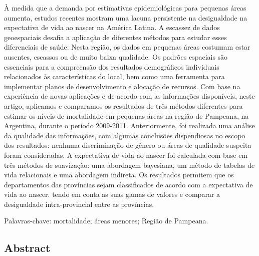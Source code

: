 \documentclass[12pt,spanish,]{article}
\begin{document}
À medida que a demanda por estimativas epidemiológicas para pequenas
áreas aumenta, estudos recentes mostram uma lacuna persistente na
desigualdade na expectativa de vida ao nascer na América Latina. A
escassez de dados geoespaciais desafia a aplicação de diferentes métodos
para estudar esses diferenciais de saúde. Nesta região, os dados em
pequenas áreas costumam estar ausentes, escassos ou de muito baixa
qualidade. Os padrões espaciais são essenciais para a compreensão dos
resultados demográficos individuais relacionados às características do
local, bem como uma ferramenta para implementar planos de
desenvolvimento e alocação de recursos. Com base na experiência de novas
aplicações e de acordo com as informações disponíveis, neste artigo,
aplicamos e comparamos os resultados de três métodos diferentes para
estimar os níveis de mortalidade em pequenas áreas na região de
Pampeana, na Argentina, durante o período 2009-2011. Anteriormente, foi
realizada uma análise da qualidade das informações, com algumas
conclusões dispendiosas no escopo dos resultados: nenhuma discriminação
de gênero ou áreas de qualidade suspeita foram consideradas. A
expectativa de vida ao nascer foi calculada com base em três métodos de
suavização: uma abordagem bayesiana, um método de tabelas de vida
relacionais e uma abordagem indireta. Os resultados permitem que os
departamentos das províncias sejam classificados de acordo com a
expectativa de vida ao nascer. tendo em conta as suas gamas de valores e
comparar a desigualdade intra-provincial entre as províncias.

Palavras-chave: mortalidade; áreas menores; Região de Pampeana.

\hypertarget{abstract}{%
\subsection{Abstract}\label{abstract}}
\end{document}
